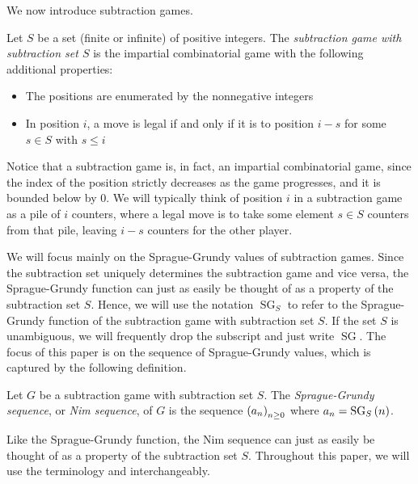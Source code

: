 \documentclass[english,12pt]{article}
\newcommand{\seq}{\p}
\DeclareMathOperator{\SG}{SG}
\begin{document}
We now introduce subtraction games.
\begin{defin}\cite{bcg}
Let $S$ be a set (finite or infinite) of positive integers.  The \emph{subtraction game with subtraction set $S$} is the %
impartial combinatorial game with the following additional properties:
\begin{itemize}
\item The positions are enumerated by the nonnegative integers
\item In position $i$, a move is legal if and only if it is to position $i-s$ for some $s\in S$ with $s\leq i$
\end{itemize}
\end{defin}
Notice that a subtraction game is, in fact, an impartial combinatorial game, since the index of the position strictly decreases as the game progresses, and it is bounded below by $0$.  We will typically think of position $i$ in a subtraction game as a pile of $i$ counters, where a legal move is to take some element $s\in S$ counters from that pile, leaving $i-s$ counters for the other player.

We will focus mainly on the Sprague-Grundy values of subtraction games.  Since the subtraction set uniquely determines the subtraction game and vice versa, the Sprague-Grundy function can just as easily be thought of as a property of the subtraction set $S$.  Hence, we will use the notation $\SG_S$ to refer to the Sprague-Grundy function of the subtraction game with subtraction set $S$.  If the set $S$ is unambiguous, we will frequently drop the subscript and just write $\SG$.  The focus of this paper is on the sequence of Sprague-Grundy values, which is captured by the following definition.
\begin{defin}
Let $G$ be a subtraction game with subtraction set $S$.  The \emph{Sprague-Grundy sequence}, or \emph{Nim sequence}, of $G$ is the sequence $\seq{a_n}_{n\geq0}$ where $a_n=\SG_S\p{n}$.
\end{defin}
Like the Sprague-Grundy function, the Nim sequence can just as easily be thought of as a property of the subtraction set $S$.  Throughout this paper, we will use the terminology  and  interchangeably.
\end{document}
